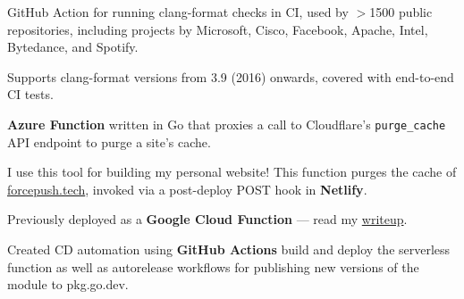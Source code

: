 \documentclass[]{jidicula-resume}
\begin{document}
\begin{tightemize}
\item GitHub Action for running clang-format checks in CI, used by $>$1500 public repositories, including projects by Microsoft, Cisco, Facebook, Apache, Intel, Bytedance, and Spotify.
\item Supports clang-format versions from 3.9 (2016) onwards, covered with end-to-end CI tests.
\end{tightemize}
\sectionsep{}

\begin{tightemize}
\item \textbf{Azure Function} written in Go that proxies a call to Cloudflare's \texttt{purge_cache} API endpoint to purge a site's cache.
\item I use this tool for building my personal website! This function purges the cache of \href{https://forcepush.tech}{forcepush.tech}, invoked via a post-deploy POST hook in \textbf{Netlify}.
\item Previously deployed as a \textbf{Google Cloud Function} --- read my \href{https://forcepush.tech/triggering-cloudflare-cache-purging-with-netlifys-post-deploy-hooks-and-a-google-cloud-function-in-go}{writeup}.
\item Created CD automation using \textbf{GitHub Actions} build and deploy the serverless function as well as autorelease workflows for publishing new versions of the module to pkg.go.dev.
\end{tightemize}
\sectionsep{}

\end{document}
